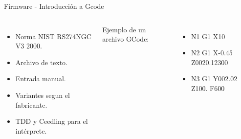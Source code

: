 \documentclass[aspectratio= 43]{beamer}
\begin{document}
\begin{frame}{Firmware - Introducción a Gcode}
   \begin{columns}
      \begin{itemize}
         \item{Norma NIST RS274NGC V3 2000.}
         \item{Archivo de texto.}
         \item{Entrada manual.}
         \item{Variantes segun el fabricante.}
         \item{TDD y Ceedling para el intérprete.}
      \end{itemize}

      Ejemplo de un archivo GCode:
      \begin{itemize}
         \item{N1 G1 X10}
         \item{N2 G1 X-0.45 Z0020.12300}
         \item{N3 G1 Y002.02 Z100. F600}
      \end{itemize}
   \end{columns}
\end{frame}
\end{document}
